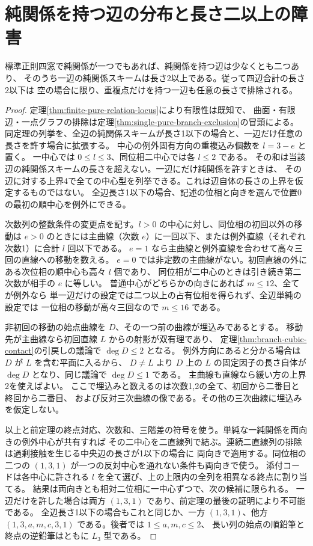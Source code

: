 \section{純関係を持つ辺の分布と長さ二以上の障害}
\label{sec:sparse-pure-edge-exclusion}
\begin{theorem}\label{thm:sparse-pure-edge-exclusion}
標準正則四窓で純関係が一つでもあれば、純関係を持つ辺は少なくとも二つあり、
そのうち一辺の純関係スキームは長さ2以上である。従って四辺合計の長さ2以下は
空の場合に限り、重複点だけを持つ一辺も任意の長さで排除される。
\end{theorem}
\begin{proof}
定理\ref{thm:finite-pure-relation-locus}により有限性は既知で、
曲面・有限辺・一点グラフの排除は定理\ref{thm:single-pure-branch-exclusion}の冒頭による。
同定理の列挙を、全辺の純関係スキームが長さ1以下の場合と、一辺だけ任意の長さを許す場合に拡張する。
中心の例外固有方向の重複込み個数を $l=3-e$ と置く。
一中心では $0\le l\le3$、同位相二中心では各 $l\le2$ である。
その和は当該辺の純関係スキームの長さを超えない。一辺にだけ純関係を許すときは、
その辺に対する上界4で全ての中心型を列挙できる。これは辺自体の長さの上界を仮定するものではない。
全辺長さ1以下の場合、記述の位相と向きを選んで位置0の最初の順中心を例外にできる。

次数列の整数条件の変更点を記す。$l>0$ の中心に対し、同位相の初回以外の移動は
$e>0$ のときには主曲線（次数 $e$）に一回以下、または例外直線（それぞれ次数1）に合計 $l$ 回以下である。
$e=1$ なら主曲線と例外直線を合わせて高々三回の直線への移動を数える。
$e=0$ では非定数の主曲線がない。初回直線の外にある次位相の順中心も高々 $l$ 個であり、
同位相が二中心のときは引き続き第二次数が相手の $e$ に等しい。
普通中心がどちらかの向きにあれば $m\le12$、全てが例外なら
単一辺だけの設定では二つ以上の占有位相を得られず、全辺単純の設定では
一位相の移動が高々三回なので $m\le16$ である。

非初回の移動の始点曲線を $D$、その一つ前の曲線が埋込みであるとする。
移動先が主曲線なら初回直線 $L$ からの射影が双有理であり、
定理\ref{thm:branch-cubic-contact}の引戻しの議論で $\deg D\le2$ となる。
例外方向にあると分かる場合は $D$ が $L$ を含む平面に入るから、
$D\ne L$ より $D$ 上の $L$ の固定因子の長さ自体が $\deg D$ となり、同じ議論で $\deg D\le1$ である。
主曲線も直線なら緩い方の上界2を使えばよい。
ここで埋込みと数えるのは次数1,2の全て、初回から二番目と終回から二番目、
および反対三次曲線の像である。その他の三次曲線に埋込みを仮定しない。

以上と前定理の終点対応、次数和、三階差の符号を使う。単純な一純関係を両向きの例外中心が共有すれば
その二中心を二直線列で結ぶ。連続二直線列の排除は過剰接触を生じる中央辺の長さが1以下の場合に
両向きで適用する。同位相の二つの $(1,3,1)$ が一つの反対中心を通れない条件も両向きで使う。
添付コードは各中心に許される $l$ を全て選び、上の上限内の全列を相異なる終点に割り当てる。
結果は両向きとも相対二位相に一中心ずつで、次の候補に限られる。
一辺だけを許した場合は両方 $(1,3,1)$ であり、前定理の最後の証明により不可能である。
全辺長さ1以下の場合もこれと同じか、一方 $(1,3,1)$、他方
$(1,3,a,m,c,3,1)$ である。後者では $1\le a,m,c\le2$、
長い列の始点の順鉛筆と終点の逆鉛筆はともに $L_3$ 型である。


\end{proof}
